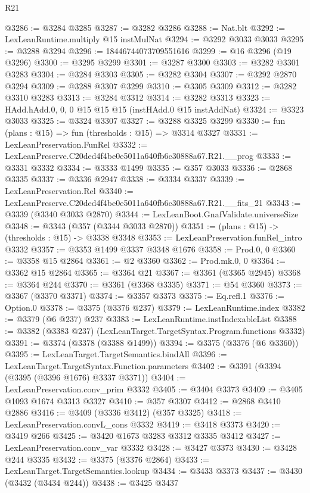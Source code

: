 \begin{lexlean}{R21}
\begin{coremodule}
{{{{{{{{{{{{{{{{{{{@3286 := @3284 @3285
@3287 := @3282 @3286
@3288 := Nat.blt
@3292 := LexLeanRuntime.multiply @15 instMulNat
@3294 := @3292 @3033 @3033
@3295 := @3288 @3294
@3296 := 18446744073709551616
@3299 := @16 @3296 (@19 @3296)
@3300 := @3295 @3299
@3301 := @3287 @3300
@3303 := @3282 @3301 @3283
@3304 := @3284 @3303
@3305 := @3282 @3304
@3307 := @3292 @2870 @3294
@3309 := @3288 @3307 @3299
@3310 := @3305 @3309
@3312 := @3282 @3310 @3283
@3313 := @3284 @3312
@3314 := @3282 @3313
@3323 := HAdd.hAdd.{0, 0, 0} @15 @15 @15 (instHAdd.{0} @15 instAddNat)
@3324 := @3323 @3033
@3325 := @3324 @3307
@3327 := @3288 @3325 @3299
@3330 := fun (plans : @15) => fun (thresholds : @15) => @3314 @3327
@3331 := LexLeanPreservation.FunRel
@3332 := LexLeanPreserve.C20ded4f4be0e5011a640fb6c30888a67.R21.__prog
@3333 := @3331 @3332
@3334 := @3333 @1499
@3335 := @357 @3033
@3336 := @2868 @3335
@3337 := @3336 @2947
@3338 := @3334 @3337
@3339 := LexLeanPreservation.Rel
@3340 := LexLeanPreserve.C20ded4f4be0e5011a640fb6c30888a67.R21.__fits_21
@3343 := @3339 (@3340 @3033 @2870)
@3344 := LexLeanBoot.GnafValidate.universeSize
@3348 := @3343 (@357 (@3344 @3033 @2870))
@3351 := (plans : @15) -> (thresholds : @15) -> @3338 @3348
@3353 := LexLeanPreservation.funRel_intro @3332
@3357 := @3353 @1499 @3337 @3348 @1676
@3358 := Prod.{0, 0}
@3360 := @3358 @15 @2864
@3361 := @2 @3360
@3362 := Prod.mk.{0, 0}
@3364 := @3362 @15 @2864
@3365 := @3364 @21
@3367 := @3361 (@3365 @2945)
@3368 := @3364 @244
@3370 := @3361 (@3368 @3335)
@3371 := @54 @3360
@3373 := @3367 (@3370 @3371)
@3374 := @3357 @3373
@3375 := Eq.refl.{1}
@3376 := Option.{0}
@3378 := @3375 (@3376 @237)
@3379 := LexLeanRuntime.index
@3382 := @3379 (@6 @237) @237
@3383 := LexLeanRuntime.instIndexableList
@3388 := @3382 (@3383 @237) (LexLeanTarget.TargetSyntax.Program.functions @3332)
@3391 := @3374 (@3378 (@3388 @1499))
@3394 := @3375 (@3376 (@6 @3360))
@3395 := LexLeanTarget.TargetSemantics.bindAll
@3396 := LexLeanTarget.TargetSyntax.Function.parameters
@3402 := @3391 (@3394 (@3395 (@3396 @1676) @3337 @3371))
@3404 := LexLeanPreservation.conv_prim @3332
@3405 := @3404 @3373
@3409 := @3405 @1093 @1674 @3313 @3327
@3410 := @357 @3307
@3412 := @2868 @3410 @2886
@3416 := @3409 (@3336 @3412) (@357 @3325)
@3418 := LexLeanPreservation.convL_cons @3332
@3419 := @3418 @3373
@3420 := @3419 @266
@3425 := @3420 @1673 @3283 @3312 @3335 @3412
@3427 := LexLeanPreservation.conv_var @3332
@3428 := @3427 @3373
@3430 := @3428 @244 @3335
@3432 := @3375 (@3376 @2864)
@3433 := LexLeanTarget.TargetSemantics.lookup
@3434 := @3433 @3373
@3437 := @3430 (@3432 (@3434 @244))
@3438 := @3425 @3437
}}}}}}}}}}}}}}}}}}}
\end{coremodule}
\end{lexlean}
